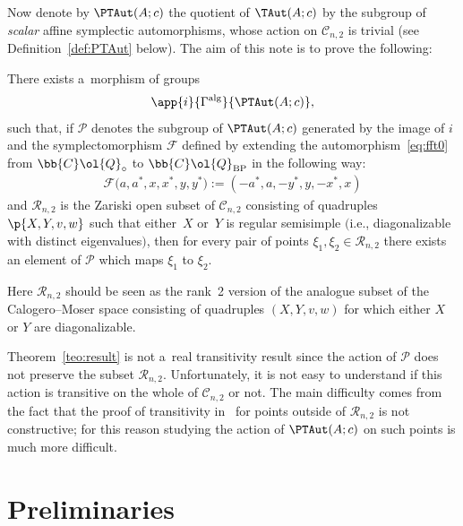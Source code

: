 Now denote by \(\PTAut(A;c)\) the quotient of \(\TAut(A;c)\) by the subgroup of \emph{scalar} af\/f\/ine
symplectic automorphisms, whose action on \(\mathcal{C}_{n,2}\) is trivial (see
Def\/inition~\ref{def:PTAut} below).
The aim of this note is to prove the following:
\begin{theorem}
\label{teo:result}
There exists a~morphism of groups
\begin{gather}
\label{eq:map}
\app{i}{\Gamma^{\mathrm{alg}}}{\PTAut(A;c)},
\end{gather}
such that, if \(\mathcal{P}\) denotes the subgroup of \(\PTAut(A;c)\) generated by the image of \(i\) and
the symplectomorphism \(\mathcal{F}\) defined by extending the automorphism~\eqref{eq:fft0} from
\(\bb{C}\ol{Q}_{\circ}\) to \(\bb{C}\ol{Q}_{\mathrm{BP}}\) in the following way:
\begin{gather}
\label{eq:def-fft}
\mathcal{F}\big(a,a^{*},x,x^{*},y,y^{*}\big)\mathrel{:=}(-a^{*},a,-y^{*},y,-x^{*},x)
\end{gather}
and \(\mathcal{R}_{n,2}\) is the Zariski open subset of \(\mathcal{C}_{n,2}\) consisting of quadruples
\(\p{X,Y,v,w}\) such that either~\(X\) or~\(Y\) is regular semisimple $($i.e., diagonalizable with distinct
eigenvalues$)$, then for every pair of points \(\xi_1,\xi_2\in \mathcal{R}_{n,2}\) there exists an element of
\(\mathcal{P}\) which maps \(\xi_1\) to \(\xi_2\).
\end{theorem}

Here \(\mathcal{R}_{n,2}\) should be seen as the rank~2 version of the analogue subset of the
Calogero--Moser space consisting of quadruples \((X,Y,v,w)\) for which either \(X\) or \(Y\) are
diagonalizable.

\begin{remark}
Theorem~\ref{teo:result} is not a~real transitivity result since the action of \(\mathcal{P}\) does not
preserve the subset \(\mathcal{R}_{n,2}\).
Unfortunately, it is not easy to understand if this action is transitive on the whole of
\(\mathcal{C}_{n,2}\) or not.
The main dif\/f\/iculty comes from the fact that the proof of transitivity in~\cite{bp08} for points
outside of \(\mathcal{R}_{n,2}\) is not constructive; for this reason studying the action of
\(\PTAut(A;c)\) on such points is much more dif\/f\/icult.
\end{remark}

\section{Preliminaries}

